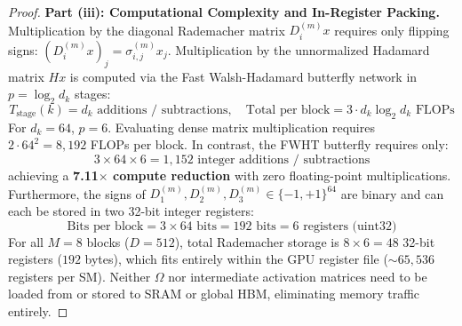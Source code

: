 \begin{proof}
\bigskip
\noindent
\textbf{Part (iii): Computational Complexity and In-Register Packing.}
Multiplication by the diagonal Rademacher matrix $D_i^{(m)} x$ requires only flipping signs: $(D_i^{(m)} x)_j = \sigma_{i, j}^{(m)} x_j$. Multiplication by the unnormalized Hadamard matrix $H x$ is computed via the Fast Walsh-Hadamard butterfly network in $p = \log_2 d_k$ stages:
\begin{equation}
T_{\text{stage}}(k) = d_k \text{ additions / subtractions}, \quad \text{Total per block} = 3 \cdot d_k \log_2 d_k \text{ FLOPs}
\end{equation}
For $d_k = 64$, $p = 6$. Evaluating dense matrix multiplication requires $2 \cdot 64^2 = 8,192$ FLOPs per block. In contrast, the FWHT butterfly requires only:
\begin{equation}
3 \times 64 \times 6 = 1,152 \text{ integer additions / subtractions}
\end{equation}
achieving a \textbf{7.11$\times$ compute reduction} with zero floating-point multiplications.
Furthermore, the signs of $D_1^{(m)}, D_2^{(m)}, D_3^{(m)} \in \{-1, +1\}^{64}$ are binary and can each be stored in two 32-bit integer registers:
\begin{equation}
\text{Bits per block} = 3 \times 64 \text{ bits} = 192 \text{ bits} = 6 \text{ registers (uint32)}
\end{equation}
For all $M = 8$ blocks ($D=512$), total Rademacher storage is $8 \times 6 = 48$ 32-bit registers ($192$ bytes), which fits entirely within the GPU register file ($\sim 65,536$ registers per SM). Neither $\Omega$ nor intermediate activation matrices need to be loaded from or stored to SRAM or global HBM, eliminating memory traffic entirely.
\end{proof}

